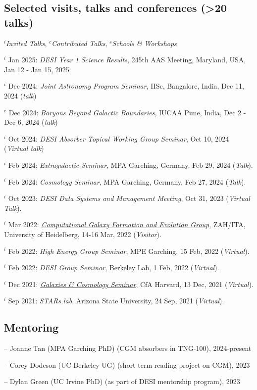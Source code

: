 \documentclass[12pt,letterpaper]{article}
\begin{document}
\subsection{Selected visits, talks and conferences (>20 talks)}
$^i$\emph{Invited Talks}, $^c$\emph{Contributed Talks}, $^s$\emph{Schools \& Workshops}
\begin{list}{}{\cvlist}
    \item $^i$ Jan 2025:  \emph{DESI Year 1 Science Results}, 245th AAS Meeting, Maryland, USA, Jan 12 - Jan 15, 2025
\item $^i$ Dec 2024:  \emph{Joint Astronomy Program Seminar}, IISc, Bangalore, India, Dec 11, 2024 (\textit{talk})
\item $^c$ Dec 2024:  \emph{Baryons Beyond Galactic Boundaries}, IUCAA Pune, India, Dec 2 - Dec 6, 2024 (\textit{talk})
\item $^i$ Oct 2024:  \emph{DESI Absorber Topical Working Group Seminar}, Oct 10, 2024 (\textit{Virtual talk})
\item $^i$ Feb 2024:  \emph{Extragalactic Seminar}, MPA Garching, Germany, Feb 29, 2024 (\textit{Talk}).
\item $^i$ Feb 2024:  \emph{Cosmology Seminar}, MPA Garching, Germany, Feb 27, 2024 (\textit{Talk}).
 \item $^i$ Oct 2023:  \emph{DESI Data Systems and Management Meeting}, Oct 31, 2023 (\textit{Virtual Talk}).
\item $^i$ Mar 2022:  \emph{\href{https://zah.uni-heidelberg.de/research-groups\#c2659}{Computational Galaxy Formation and Evolution Group}}, ZAH/ITA, University of Heidelberg, 14-16 Mar, 2022 (\textit{Visitor}).
\item $^i$ Feb 2022:  \emph{High Energy Group Seminar}, MPE Garching, 15 Feb, 2022 (\textit{Virtual}).
\item $^i$ Feb 2022:  \emph{DESI Group Seminar}, Berkeley Lab, 1 Feb, 2022 (\textit{Virtual}).
\item $^i$ Dec 2021:  \emph{\href{https://pweb.cfa.harvard.edu/calendar/event/9298}{Galaxies \& Cosmology Seminar}}, CfA Harvard, 13 Dec, 2021 (\textit{Virtual}).
\item $^i$ Sep 2021:  \textit{STARs lab}, Arizona State University, 24 Sep, 2021 (\textit{Virtual}).

\end{list}

\subsection{Mentoring}
\begin{list}{}{\cvlist}
\item -- Joanne Tan (MPA Garching PhD) (CGM absorbers in TNG-100), 2024-present
\item -- Corey Dodeson (UC Berkeley UG) (short-term reading project on CGM), 2023
\item -- Dylan Green (UC Irvine PhD) (as part of DESI mentorship program), 2023
\end{list}
\end{document}
